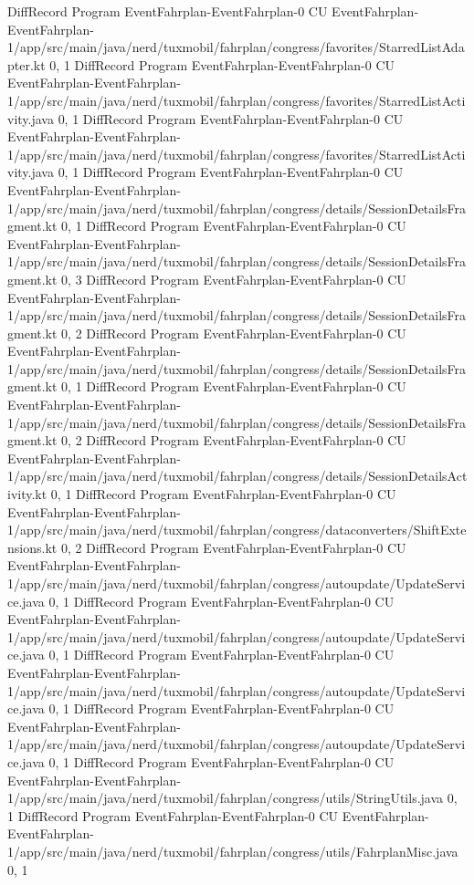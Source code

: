 DiffRecord Program EventFahrplan-EventFahrplan-0 CU EventFahrplan-EventFahrplan-1/app/src/main/java/nerd/tuxmobil/fahrplan/congress/favorites/StarredListAdapter.kt  {0, 1}
DiffRecord Program EventFahrplan-EventFahrplan-0 CU EventFahrplan-EventFahrplan-1/app/src/main/java/nerd/tuxmobil/fahrplan/congress/favorites/StarredListActivity.java  {0, 1}
DiffRecord Program EventFahrplan-EventFahrplan-0 CU EventFahrplan-EventFahrplan-1/app/src/main/java/nerd/tuxmobil/fahrplan/congress/favorites/StarredListActivity.java  {0, 1}
DiffRecord Program EventFahrplan-EventFahrplan-0 CU EventFahrplan-EventFahrplan-1/app/src/main/java/nerd/tuxmobil/fahrplan/congress/details/SessionDetailsFragment.kt  {0, 1}
DiffRecord Program EventFahrplan-EventFahrplan-0 CU EventFahrplan-EventFahrplan-1/app/src/main/java/nerd/tuxmobil/fahrplan/congress/details/SessionDetailsFragment.kt  {0, 3}
DiffRecord Program EventFahrplan-EventFahrplan-0 CU EventFahrplan-EventFahrplan-1/app/src/main/java/nerd/tuxmobil/fahrplan/congress/details/SessionDetailsFragment.kt  {0, 2}
DiffRecord Program EventFahrplan-EventFahrplan-0 CU EventFahrplan-EventFahrplan-1/app/src/main/java/nerd/tuxmobil/fahrplan/congress/details/SessionDetailsFragment.kt  {0, 1}
DiffRecord Program EventFahrplan-EventFahrplan-0 CU EventFahrplan-EventFahrplan-1/app/src/main/java/nerd/tuxmobil/fahrplan/congress/details/SessionDetailsFragment.kt  {0, 2}
DiffRecord Program EventFahrplan-EventFahrplan-0 CU EventFahrplan-EventFahrplan-1/app/src/main/java/nerd/tuxmobil/fahrplan/congress/details/SessionDetailsActivity.kt  {0, 1}
DiffRecord Program EventFahrplan-EventFahrplan-0 CU EventFahrplan-EventFahrplan-1/app/src/main/java/nerd/tuxmobil/fahrplan/congress/dataconverters/ShiftExtensions.kt  {0, 2}
DiffRecord Program EventFahrplan-EventFahrplan-0 CU EventFahrplan-EventFahrplan-1/app/src/main/java/nerd/tuxmobil/fahrplan/congress/autoupdate/UpdateService.java  {0, 1}
DiffRecord Program EventFahrplan-EventFahrplan-0 CU EventFahrplan-EventFahrplan-1/app/src/main/java/nerd/tuxmobil/fahrplan/congress/autoupdate/UpdateService.java  {0, 1}
DiffRecord Program EventFahrplan-EventFahrplan-0 CU EventFahrplan-EventFahrplan-1/app/src/main/java/nerd/tuxmobil/fahrplan/congress/autoupdate/UpdateService.java  {0, 1}
DiffRecord Program EventFahrplan-EventFahrplan-0 CU EventFahrplan-EventFahrplan-1/app/src/main/java/nerd/tuxmobil/fahrplan/congress/autoupdate/UpdateService.java  {0, 1}
DiffRecord Program EventFahrplan-EventFahrplan-0 CU EventFahrplan-EventFahrplan-1/app/src/main/java/nerd/tuxmobil/fahrplan/congress/utils/StringUtils.java  {0, 1}
DiffRecord Program EventFahrplan-EventFahrplan-0 CU EventFahrplan-EventFahrplan-1/app/src/main/java/nerd/tuxmobil/fahrplan/congress/utils/FahrplanMisc.java  {0, 1}
